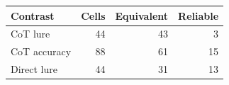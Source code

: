 \begin{tabular}{@{}lrrr@{}}
\toprule
Contrast & Cells & Equivalent & Reliable \\
\midrule
CoT lure & 44 & 43 & 3 \\
CoT accuracy & 88 & 61 & 15 \\
Direct lure & 44 & 31 & 13 \\
\bottomrule
\end{tabular}
